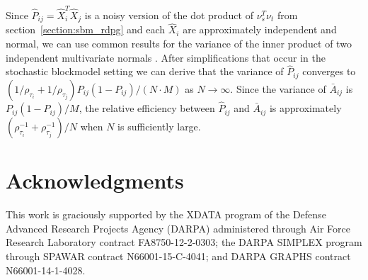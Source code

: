 \documentclass[10pt,letterpaper]{article}
\begin{document}
Since $\hat{P}_{ij} = \hat{X}_i^T \hat{X}_j$ is a noisy version of the dot product of $\nu_s^T \nu_t$ from section~\ref{section:sbm_rdpg} and each $\hat{X}_i$ are approximately independent and normal, we can use common results for the variance of the inner product of two independent multivariate normals \citet{brown1977means}.
After simplifications that occur in the stochastic blockmodel setting we can derive that the variance of $\hat{P}_{ij}$ converges to $\left( 1/\rho_{\tau_i} + 1/\rho_{\tau_j} \right) P_{ij} (1-P_{ij})/(N \cdot M)$ as $N \rightarrow \infty$. 
Since the variance of $\bar{A}_{ij}$ is $P_{ij} (1-P_{ij})/M$, the relative efficiency between $\hat{P}_{ij}$ and $\bar{A}_{ij}$ is approximately $(\rho_{\tau_i}^{-1} + \rho_{\tau_j}^{-1})/N$ when $N$ is sufficiently large.
    

\section*{Acknowledgments}

This work is graciously supported by the XDATA program of the Defense
Advanced Research Projects Agency (DARPA) administered through Air
Force Research Laboratory contract FA8750-12-2-0303; the DARPA SIMPLEX
program through SPAWAR contract N66001-15-C-4041; and DARPA GRAPHS
contract N66001-14-1-4028.

\nolinenumbers
\end{document}
